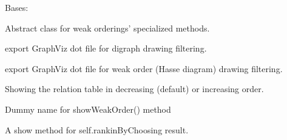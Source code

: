 \documentclass[letterpaper,10pt,english]{sphinxmanual}
\begin{document}
\begin{fulllineitems}
\label{techDoc:weakOrders.WeakOrder}
Bases: {\hyperref[techDoc:digraphs.Digraph]{\emph{}}}

Abstract class for weak orderings' specialized methods.

\begin{fulllineitems}
\label{techDoc:weakOrders.WeakOrder.exportDigraphGraphViz}
export GraphViz dot file for digraph drawing filtering.

\end{fulllineitems}


\begin{fulllineitems}
\label{techDoc:weakOrders.WeakOrder.exportGraphViz}
export GraphViz dot file for weak order (Hasse diagram) drawing filtering.

\end{fulllineitems}


\begin{fulllineitems}
\label{techDoc:weakOrders.WeakOrder.showOrderedRelationTable}
Showing the relation table in decreasing (default) or increasing order.

\end{fulllineitems}


\begin{fulllineitems}
\label{techDoc:weakOrders.WeakOrder.showRankingByChoosing}
Dummy name for showWeakOrder() method

\end{fulllineitems}


\begin{fulllineitems}
\label{techDoc:weakOrders.WeakOrder.showWeakOrder}
A show method for self.rankinByChoosing result.

\end{fulllineitems}


\end{fulllineitems}
\end{document}
